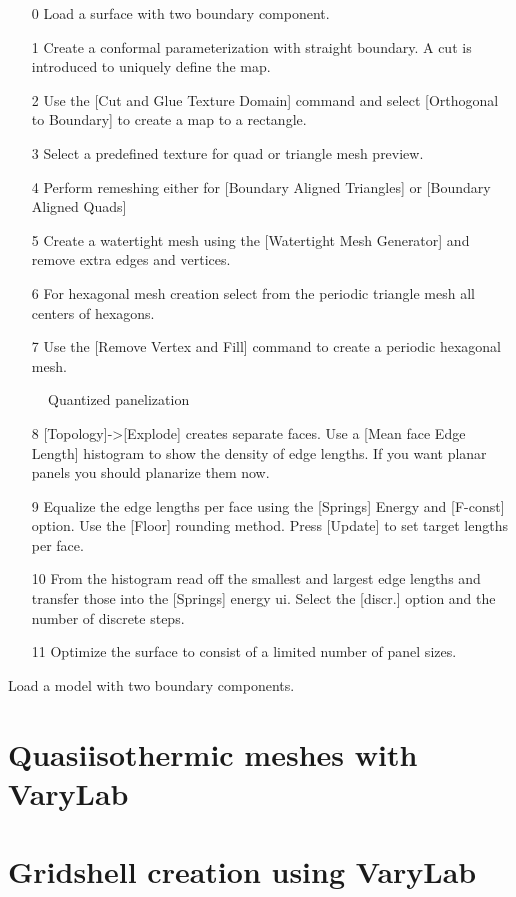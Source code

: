 \documentclass[Thesis.tex]{subfiles}
\begin{document}
\begin{itemize}
\item[0] Load a surface with two boundary component.
\item[1] Create a conformal parameterization with straight boundary. A cut is introduced to uniquely define the map.
\item[2] Use the [Cut and Glue Texture Domain] command and select [Orthogonal to Boundary] to create a map to a rectangle.
\item[3] Select a predefined texture for quad or triangle mesh preview.
\item[4] Perform remeshing either for [Boundary Aligned Triangles] or [Boundary Aligned Quads]
\item[5] Create a watertight mesh using the [Watertight Mesh Generator] and remove extra edges and vertices.
\item[6] For hexagonal mesh creation select from the periodic triangle mesh all centers of hexagons. 
\item[7] Use the [Remove Vertex and Fill] command to create a periodic hexagonal mesh.
\end{itemize}

\begin{figure}
\caption{Quantized panelization}
\label{fig:quantization_algorithm}
\end{figure}



\begin{itemize}
\item[8] [Topology]->[Explode] creates separate faces. Use a [Mean face Edge Length] histogram to show the density of edge lengths. If you want planar panels you should planarize them now. 
\item[9] Equalize the edge lengths per face using the [Springs] Energy and [F-const] option. Use the [Floor] rounding method. Press [Update] to set target lengths per face.
\item[10] From the histogram read off the smallest and largest edge lengths and transfer those into the [Springs] energy ui. Select the [discr.] option and the number of discrete steps.
\item[11] Optimize the surface to consist of a limited number of panel sizes.
\end{itemize}


Load a model with two boundary components. 

\section{Quasiisothermic meshes with {\sc VaryLab}}

\section{Gridshell creation using {\sc VaryLab}}

\subfilebibliography
\end{document}
